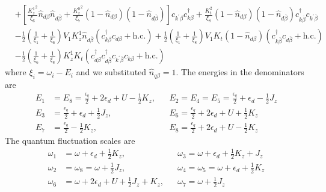 \documentclass[twoside]{report}
\numberwithin{equation}{section}
\begin{document}
\begin{equation}
\begin{aligned}
&+ \left[\frac{{K_z^1}^2}{\xi_6}\hat n_{d\beta}\hat n_{d\overline\beta} + \frac{{K_z^0}^2}{\xi_7}\left(1 - \hat n_{d\beta}\right)\left(1 - \hat n_{d\overline\beta}\right)\right]c_{k^\prime\beta}c^\dagger_{k\beta} + \frac{K_t^2}{\xi_8}\left(1 - \hat n_{d\beta}\right)\left(1 - \hat n_{d\overline\beta}\right)c^\dagger_{k\overline\beta}c_{k^\prime\overline\beta}\\
&- \frac{1}{2}\left(\frac{1}{\xi_1} + \frac{1}{\xi_6} \right)V_1 K_z^1 \hat n_{d\overline\beta}\left(c^\dagger_{k\beta}c_{d\beta} + \text{h.c.}\right) + \frac{1}{2}\left(\frac{1}{\xi_1} + \frac{1}{\xi_8} \right)V_1 K_t \left(1 - \hat n_{d\beta}\right)\left(c^\dagger_{k\overline\beta}c_{d\overline\beta} + \text{h.c.}\right)\\
&- \frac{1}{2}\left(\frac{1}{\xi_6} + \frac{1}{\xi_8} \right)K_z^1 K_t \left(c^\dagger_{d\beta}c^\dagger_{d\overline\beta}c_{k^\prime\overline\beta}c_{k\beta} + \text{h.c.}\right)
\end{aligned}\end{equation}
where \(\xi_i = \omega_i - E_i\) and we substituted \(\hat n_{q\beta}=1\). The energies in the denominators are
\begin{equation}\begin{aligned}
E_1&= E_8 = \frac{\epsilon_q}{2} + 2\epsilon_d+ U - \frac{1}{2}K_z, &&E_2 = E_4 = E_5 = \frac{\epsilon_q}{2} + \epsilon_d - \frac{1}{2}J_z\\
E_3&=\frac{\epsilon_q}{2} + \epsilon_d + \frac{1}{2}J_z, &&E_6 =\frac{\epsilon_q}{2} + 2\epsilon_d+ U + \frac{1}{2}K_z\\
E_7&=\frac{\epsilon_q}{2} - \frac{1}{2}K_z, &&E_8=\frac{\epsilon_q}{2}+2\epsilon_d+ U  - \frac{1}{2}K_z
\end{aligned}\end{equation}
The quantum fluctuation scales are
\begin{equation}\begin{aligned}
\omega_1&=\omega + \epsilon_d+\frac{1}{2}K_z, &&\omega_3 =\omega+\epsilon_d + \frac{1}{2}K_z + J_z\\
\omega_2& = \omega_8 = \omega+\frac{1}{2}J_z, &&\omega_4 = \omega_5 = \omega + \epsilon_d + \frac{1}{2}K_z\\
\omega_6&=\omega+2\epsilon_d+U+\frac{1}{2}J_z + K_z, &&\omega_7 =\omega+\frac{1}{2}J_z\\
\end{aligned}\end{equation}
\end{document}
